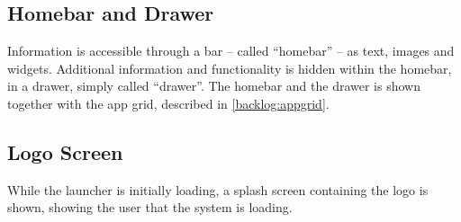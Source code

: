 %
\subsection{Homebar and Drawer}
\label{backlog:homebar_drawer}
Information is accessible through a bar -- called ``homebar'' -- as text, images and widgets.
Additional information and functionality is hidden within the homebar, in a drawer, simply called ``drawer''. 
The homebar and the drawer is shown together with the app grid, described in \autoref{backlog:appgrid}.

%
\subsection{Logo Screen}
\label{backlog:logo_screen}
While the launcher is initially loading, a splash screen containing the \giraf[] logo is shown, showing the user that the system is loading.
